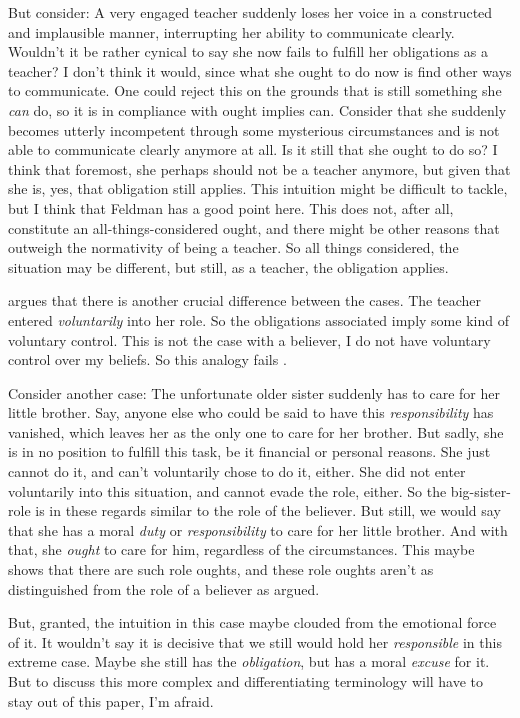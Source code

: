 \documentclass[12pt,numbers=noenddot]{scrartcl}
\begin{document}
But consider: A very engaged teacher suddenly loses her voice in a constructed and implausible manner, interrupting her ability to communicate clearly. Wouldn't it be rather cynical to say she now fails to fulfill her obligations as a teacher? I don't think it would, since what she ought to do now is find other ways to communicate. One could reject this on the grounds that is still something she \emph{can} do, so it is in compliance with ought implies can. Consider that she suddenly becomes utterly incompetent through some mysterious circumstances and is not able to communicate clearly anymore at all. Is it still that she ought to do so? I think that foremost, she perhaps should not be a teacher anymore, but given that she is, yes, that obligation still applies. This intuition might be difficult to tackle, but I think that Feldman has a good point here. This does not, after all, constitute an all-things-considered ought, and there might be other reasons that outweigh the normativity of being a teacher. So all things considered, the situation may be different, but still, as a teacher, the obligation applies.

\textcite[686]{Peels2014-PEEADC} argues that there is another crucial difference between the cases. The teacher entered \emph{voluntarily} into her role. So the obligations associated imply some kind of voluntary control. This is not the case with a believer, I do not have voluntary control over my beliefs. So this analogy fails \autocite[687]{Peels2014-PEEADC}.

Consider another case: The unfortunate older sister suddenly has to care for her little brother. Say, anyone else who could be said to have this \emph{responsibility} has vanished, which leaves her as the only one to care for her brother. But sadly, she is in no position to fulfill this task, be it financial or personal reasons. She just cannot do it, and can't voluntarily chose to do it, either. She did not enter voluntarily into this situation, and cannot evade the role, either. So the big-sister-role is in these regards similar to the role of the believer. But still, we would say that she has a moral \emph{duty} or \emph{responsibility} to care for her little brother. And with that, she \emph{ought} to care for him, regardless of the circumstances. This maybe shows that there are such role oughts, and these role oughts aren't as distinguished from the role of a believer as argued.

But, granted, the intuition in this case maybe clouded from the emotional force of it. It wouldn't say it is decisive that we still would hold her \emph{responsible} in this extreme case. Maybe she still has the \emph{obligation}, but has a moral \emph{excuse} for it. But to discuss this more complex and differentiating terminology will have to stay out of this paper, I'm afraid.
\end{document}
